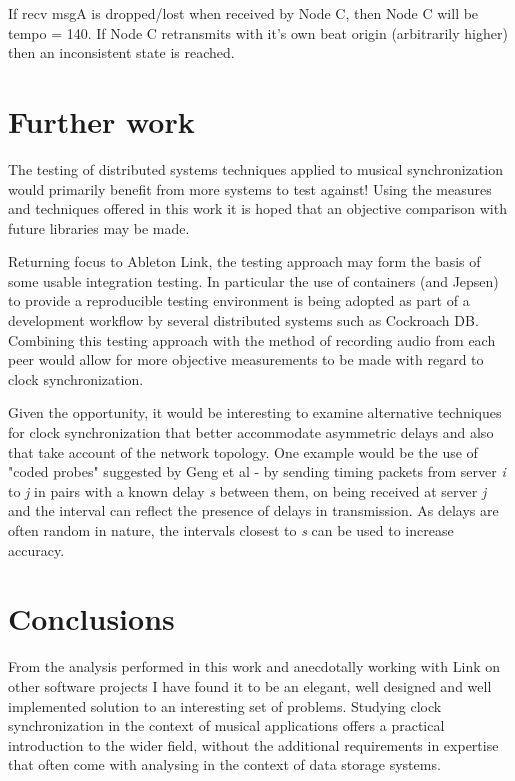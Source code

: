 \documentclass[11pt]{article} %
\theoremstyle{plain}
\theoremstyle{definition}
\begin{document}
If recv msgA is dropped/lost when received by Node C, then Node C will be tempo
= 140. If Node C retransmits with it's own beat origin (arbitrarily higher) then an inconsistent state is reached.

\section{Further work}

The testing of distributed systems techniques applied to musical
synchronization would primarily benefit from more systems to test against!
Using the measures and techniques offered in this work it is hoped that an
objective comparison with future libraries may be made.

Returning focus to Ableton Link, the testing approach may form the basis of
some usable integration testing. In particular the use of containers (and
Jepsen) to provide a reproducible testing environment is being adopted as part
of a development workflow by several distributed systems such as Cockroach
DB\cite{cockroach}. Combining this testing approach with the method of
recording audio from each peer would allow for more objective measurements to
be made with regard to clock synchronization.

Given the opportunity, it would be interesting to examine alternative
techniques for clock synchronization that better accommodate asymmetric delays
and also that take account of the network topology. One example would be the
use of "coded probes" suggested by Geng et al\cite{geng2018} - by sending
timing packets from server \textit{i} to \textit{j} in pairs with a known delay
\textit{s} between them, on being received at server \textit{j} and the
interval can reflect the presence of delays in transmission. As delays are
often random in nature, the intervals closest to \textit{s} can be used to
increase accuracy.

\section{Conclusions}

From the analysis performed in this work and anecdotally working with Link on
other software projects I have found it to be an elegant, well designed and
well implemented solution to an interesting set of problems. Studying clock
synchronization in the context of musical applications offers a practical
introduction to the wider field, without the additional requirements in
expertise that often come with analysing in the context of data storage
systems.
\end{document}

